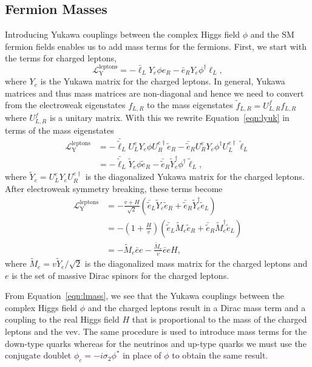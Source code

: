 \subsection{Fermion Masses}
\label{subsec:yukawa}

Introducing Yukawa couplings between the complex Higgs field $\phi$ and the SM fermion fields enables us to add mass terms for the fermions.
First, we start with the terms for charged leptons,
\begin{equation}
  \label{eqn:lyuk}
  \mathcal{L}^{\text{leptons}}_{\text{Y}} = - \bar \ell_L Y_e \phi e_R - \bar e_R Y_e \phi^\dagger \ell_L,
\end{equation}
where $Y_e$ is the Yukawa matrix for the charged leptons.
In general, Yukawa matrices and thus mass matrices are non-diagonal and hence we need to convert from the electroweak eigenstates $f_{L,R}$ to the mass eigenstates $\tilde{f}_{L,R} = U^{f}_{L,R} f_{L,R}$ where $U^{f}_{L,R}$ is a unitary matrix.
With this we rewrite Equation~\ref{eqn:lyuk} in terms of the mass eigenstates
\begin{align}
  \mathcal{L}^{\text{leptons}}_{\text{Y}} & = - \bar{\tilde{\ell}}_{L} U^e_L Y_e \phi U^{e\dagger}_R \tilde{e}_{R} - \bar{\tilde{e}}_{R} U^e_R Y_e \phi^\dagger U^{e\dagger}_L \tilde{\ell}_{L} \nonumber \\
  & = - \bar{\tilde{\ell}}_{L} \tilde Y_e \phi \tilde{e}_{R} - \bar{\tilde{e}}_{R} \tilde Y_e^\dagger \phi^\dagger \tilde{\ell}_{L}, 
\end{align}
where $\tilde Y_e = U^e_L Y_e U^{e\dagger}_R$ is the diagonalized Yukawa matrix for the charged leptons.
After electroweak symmetry breaking, these terms become
\begin{align}
  \mathcal{L}^{\text{leptons}}_{\text{Y}} & = - \frac{v + H}{\sqrt{2}} \left( \bar{\tilde{e}}_L \tilde Y_e  \tilde{e}_R + \bar{\tilde{e}}_R \tilde Y_e^\dagger \tilde{e}_L \right) \nonumber \\
  & = - \left(1 + \frac{H}{v}\right) \left( \bar{\tilde{e}}_L \tilde M_e \tilde{e}_R + \bar{\tilde{e}}_R \tilde M_e^\dagger \tilde{e}_L \right) \nonumber \\
  & = - \tilde M_e \bar e e - \frac{\tilde M_e}{v} \bar e e H,
    \label{eqn:lmass}
\end{align}
where $\tilde M_e = v \tilde Y_e / \sqrt{2}$ is the diagonalized mass matrix for the charged leptons and $e$ is the set of massive Dirac spinors for the charged leptons.

From Equation~\ref{eqn:lmass}, we see that the Yukawa couplings between the complex Higgs field $\phi$ and the charged leptons result in a Dirac mass term and a coupling to the real Higgs field $H$ that is proportional to the mass of the charged leptons and the vev.
The same procedure is used to introduce mass terms for the down-type quarks whereas for the neutrinos and up-type quarks we must use the conjugate doublet $\phi_c = - i \sigma_2 \phi^*$ in place of $\phi$ to obtain the same result.

